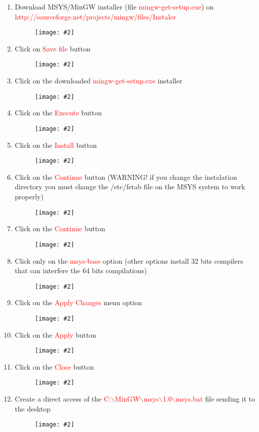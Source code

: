 \documentclass[a4paper]{article}
\newcommand{\FIG}[2]
{
	\begin{figure}[ht!]
	\centering
	\texttt{[image: \#2]}
	\end{figure}
}
\newcommand{\FIGURE}[1]{\FIG{0.35}{#1}}
\newcommand{\RED}[1] {\textcolor{red}{#1}}
\begin{document}
\begin{enumerate}

\item Download MSYS/MinGW installer (file \RED{mingw-get-setup.exe}) on \newline
\RED{http://sourceforge.net/projects/mingw/files/Instaler}

\FIGURE{msys-1.png.eps}

\item Click on \RED{Save file} button
\FIGURE{msys-2.png.eps}

\clearpage

\item Click on the downloaded \RED{mingw-get-setup.exe} installer
\FIGURE{msys-3.png.eps}

\item Click on the \RED{Execute} button
\FIGURE{msys-4.png.eps}

\clearpage

\item Click on the \RED{Install} button
\FIGURE{msys-5.png.eps}

\item Click on the \RED{Continue} button (WARNING! if you change the instalation
directory you must change the /etc/fstab file on the MSYS system to work
properly)
\FIGURE{msys-6.png.eps}

\clearpage

\item Click on the \RED{Continue} button
\FIGURE{msys-7.png.eps}

\item Click only on the \RED{msys-base} option (other options install 32 bits
compilers that can interfere the 64 bits compilations)
\FIGURE{msys-8.png.eps}

\clearpage

\item Click on the \RED{Apply Changes} menu option
\FIGURE{msys-9.png.eps}

\item Click on the \RED{Apply} button
\FIGURE{msys-10.png.eps}

\clearpage

\item Click on the \RED{Close} button
\FIGURE{msys-11.png.eps}

\item Create a direct access of the
\RED{C:$\backslash$MinGW$\backslash$msys$\backslash$1.0$\backslash$msys.bat}
file sending it to the desktop
\FIGURE{msys-12.png.eps}


\end{enumerate}
\end{document}
